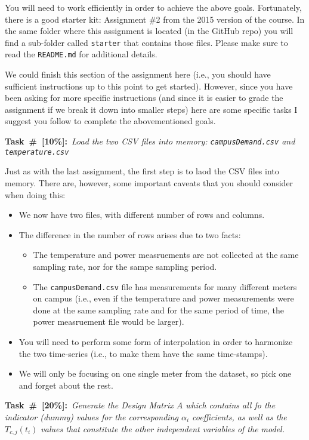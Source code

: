 \documentclass[times, 12pt, singlecolumn]{article}
\newcounter{TaskCounter}
\newcommand{\addtask}[2] {
\stepcounter{TaskCounter}
\begin{leftbar}
	{\bf Task~\#\theTaskCounter~[#1\%]:}~{\em #2} 
\end{leftbar}
}
\begin{document}
You will need to work efficiently in order to achieve the above goals. Fortunately, there is a good starter kit: Assignment \#2 from the 2015 version of the course. In the same folder where this assignment is located (in the GitHub repo) you will find a sub-folder called \texttt{starter} that contains those files. Please make sure to read the \texttt{README.md} for additional details.

We could finish this section of the assignment here (i.e., you should have sufficient instructions up to this point to get started). However, since you have been asking for more specific instructions (and since it is easier to grade the assignment if we break it down into smaller steps) here are some specific tasks I suggest you follow to complete the abovementioned goals.

\addtask{10}{Load the two CSV files into memory: \texttt{campusDemand.csv} and \texttt{temperature.csv}}

Just as with the last assignment, the first step is to laod the CSV files into memory. There are, however, some important caveats that you should consider when doing this:

\begin{itemize}
	\item{We now have two files, with different number of rows and columns.}
	\item{The difference in the number of rows arises due to two facts:}
	\begin{itemize}
		\item{The temperature and power measruements are not collected at the same sampling rate, nor for the sampe sampling period.}
		\item{The \texttt{campusDemand.csv} file has measurements for many different meters on campus (i.e., even if the temperature and power measurements were done at the same sampling rate and for the same period of time, the power measruement file would be larger).} 
	\end{itemize}
	\item{You will need to perform some form of interpolation in order to harmonize the two time-series (i.e., to make them have the same time-stamps).}
	\item{We will only be focusing on one single meter from the dataset, so pick one and forget about the rest.}
\end{itemize} 

\addtask{20}{Generate the Design Matrix $A$ which contains all fo the indicator (dummy) values for the corresponding $\alpha_i$ coefficients, as well as the $T_{c,j}(t_i)$ values that constitute the other independent variables of the model.}
\end{document}
